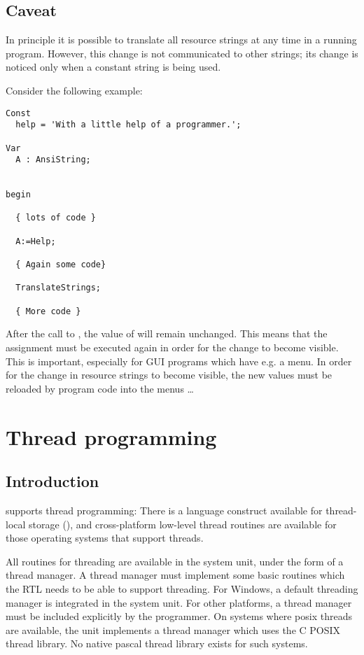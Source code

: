 \section{Caveat}
In principle it is possible to translate all resource strings at any time in
a running program. However, this change is not communicated to other
strings; its change is noticed only when a constant string is being used.

Consider the following example:
\begin{verbatim}
Const
  help = 'With a little help of a programmer.';

Var
  A : AnsiString;


begin

  { lots of code }

  A:=Help;

  { Again some code}

  TranslateStrings;

  { More code }
\end{verbatim}
After the call to , the value of  will remain
unchanged. This means that the assignment  must be executed
again in order for the change to become visible. This is important,
especially for GUI programs which have e.g. a menu. In order for the
change in resource strings to become visible, the new values must be
reloaded by program code into the menus \dots

\chapter{Thread programming}

\section{Introduction}
\fpc supports thread programming: There is a language construct 
available for thread-local storage (), and cross-platform
low-level thread routines are available for those operating systems that
support threads.

All routines for threading are available in the system unit, under the form 
of a thread manager. A thread manager must implement some basic routines
which the RTL needs to be able to support threading. For Windows, a default
threading manager is integrated in the system unit. For other platforms,
a thread manager must be included explicitly by the programmer. On systems
where posix threads are available, the  unit implements a
thread manager which uses the C POSIX  thread library. No native pascal
thread library exists for such systems.

